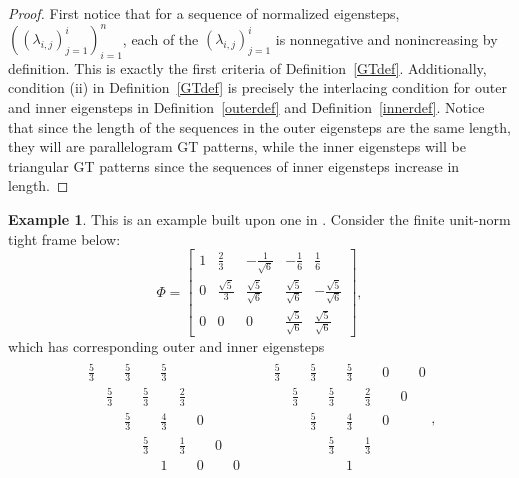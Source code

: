 \documentclass[10pt]{article}
\theoremstyle{plain}
\theoremstyle{definition}
\newtheorem{example}[thm]{Example}
\begin{document}
\begin{proof}
First notice that for a sequence of normalized eigensteps, $((\lambda_{i,j})^i_{j=1})^n_{i=1}$, each of the $(\lambda_{i,j})^i_{j=1}$ is nonnegative and nonincreasing by definition. This is exactly the first criteria of Definition~\ref{GTdef}. Additionally, condition (ii) in Definition~\ref{GTdef} is precisely the interlacing condition for outer and inner eigensteps in Definition~\ref{outerdef} and Definition~\ref{innerdef}. Notice that since the length of the sequences in the outer eigensteps are the same length, they will are parallelogram GT patterns, while the inner eigensteps will be triangular GT patterns since the sequences of inner eigensteps increase in length.
\end{proof}

\begin{example}
This is an example built upon one in \cite{cfpconstructingselfadjoint}. Consider the finite unit-norm tight frame below:
\[
\Phi = \begin{bmatrix}
1 & \frac{2}{3} & -\frac{1}{\sqrt{6}} & -\frac{1}{6} & \frac{1}{6} \\
0 & \frac{\sqrt{5}}{3} & \frac{\sqrt{5}}{\sqrt{6}} & \frac{\sqrt{5}}{\sqrt{6}} & -\frac{\sqrt{5}}{\sqrt{6}} \\
0 &  0 & 0  & \frac{\sqrt{5}}{\sqrt{6}}  & \frac{\sqrt{5}}{\sqrt{6}}
\end{bmatrix},
\]
which has corresponding outer and inner eigensteps
\begin{align*}
\begin{matrix}
\frac{5}{3} & & \frac{5}{3} & & \frac{5}{3} \\
& \frac{5}{3} & & \frac{5}{3} & & \frac{2}{3} \\
& & \frac{5}{3} & & \frac{4}{3} & & 0 \\ 
& & & \frac{5}{3} & & \frac{1}{3} & & 0 \\ 
& & & & 1 & & 0 & & 0 \\ 
\end{matrix}
&&
\begin{matrix}
\frac{5}{3} & & \frac{5}{3} & & \frac{5}{3} & & 0 & & 0  \\
& \frac{5}{3} & & \frac{5}{3} & & \frac{2}{3} & & 0  \\
& & \frac{5}{3} & & \frac{4}{3} & & 0 \\ 
& & & \frac{5}{3} & & \frac{1}{3} \\ 
& & & & 1 \\ 
\end{matrix},

\end{align*}
\end{example}
\end{document}
